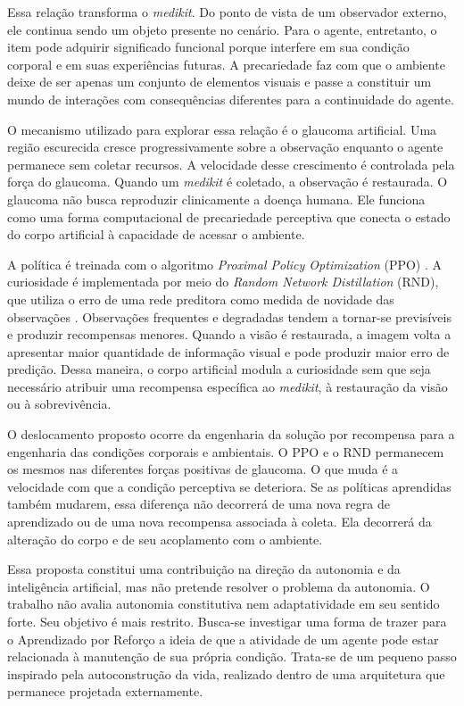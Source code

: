 Essa relação transforma o \textit{medikit}. Do ponto de vista de um observador externo, ele continua sendo um objeto presente no cenário. Para o agente, entretanto, o item pode adquirir significado funcional porque interfere em sua condição corporal e em suas experiências futuras. A precariedade faz com que o ambiente deixe de ser apenas um conjunto de elementos visuais e passe a constituir um mundo de interações com consequências diferentes para a continuidade do agente.

O mecanismo utilizado para explorar essa relação é o glaucoma artificial. Uma região escurecida cresce progressivamente sobre a observação enquanto o agente permanece sem coletar recursos. A velocidade desse crescimento é controlada pela força do glaucoma. Quando um \textit{medikit} é coletado, a observação é restaurada. O glaucoma não busca reproduzir clinicamente a doença humana. Ele funciona como uma forma computacional de precariedade perceptiva que conecta o estado do corpo artificial à capacidade de acessar o ambiente.

A política é treinada com o algoritmo \textit{Proximal Policy Optimization} (PPO) \cite{ppo}. A curiosidade é implementada por meio do \textit{Random Network Distillation} (RND), que utiliza o erro de uma rede preditora como medida de novidade das observações \cite{rnd}. Observações frequentes e degradadas tendem a tornar-se previsíveis e produzir recompensas menores. Quando a visão é restaurada, a imagem volta a apresentar maior quantidade de informação visual e pode produzir maior erro de predição. Dessa maneira, o corpo artificial modula a curiosidade sem que seja necessário atribuir uma recompensa específica ao \textit{medikit}, à restauração da visão ou à sobrevivência.

O deslocamento proposto ocorre da engenharia da solução por recompensa para a engenharia das condições corporais e ambientais. O PPO e o RND permanecem os mesmos nas diferentes forças positivas de glaucoma. O que muda é a velocidade com que a condição perceptiva se deteriora. Se as políticas aprendidas também mudarem, essa diferença não decorrerá de uma nova regra de aprendizado ou de uma nova recompensa associada à coleta. Ela decorrerá da alteração do corpo e de seu acoplamento com o ambiente.

Essa proposta constitui uma contribuição na direção da autonomia e da inteligência artificial, mas não pretende resolver o problema da autonomia. O trabalho não avalia autonomia constitutiva nem adaptatividade em seu sentido forte. Seu objetivo é mais restrito. Busca-se investigar uma forma de trazer para o Aprendizado por Reforço a ideia de que a atividade de um agente pode estar relacionada à manutenção de sua própria condição. Trata-se de um pequeno passo inspirado pela autoconstrução da vida, realizado dentro de uma arquitetura que permanece projetada externamente.

